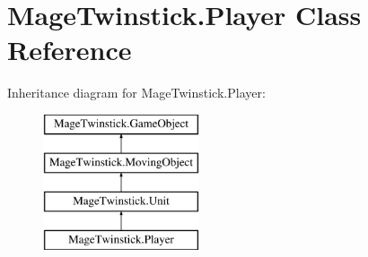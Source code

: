 \hypertarget{class_mage_twinstick_1_1_player}{}\section{Mage\+Twinstick.\+Player Class Reference}
\label{class_mage_twinstick_1_1_player}
Inheritance diagram for Mage\+Twinstick.\+Player\+:\begin{figure}[H]
\begin{center}
\leavevmode
\includegraphics[height=4.000000cm]{class_mage_twinstick_1_1_player}
\end{center}
\end{figure}
